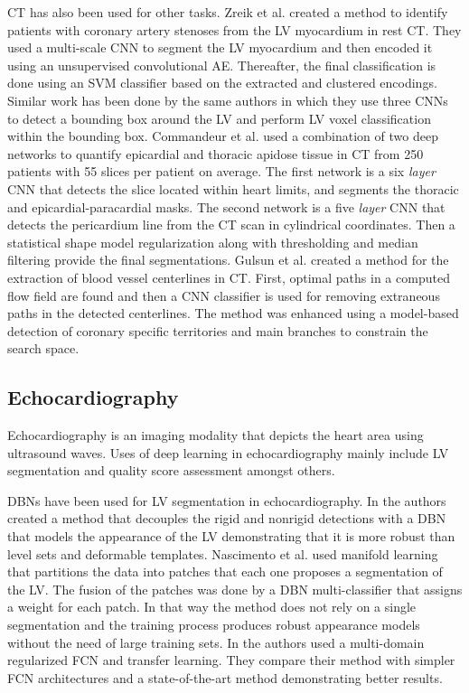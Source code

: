 \documentclass[journal]{IEEEtran}
\begin{document}
CT has also been used for other tasks.
Zreik et al.\cite{zreik2018deep} created a method to identify patients with coronary artery stenoses from the LV myocardium in rest CT\@.
They used a multi-scale CNN to segment the LV myocardium and then encoded it using an unsupervised convolutional AE\@.
Thereafter, the final classification is done using an SVM classifier based on the extracted and clustered encodings.
Similar work has been done by the same authors in\cite{zreik2016automatic} which they use three CNNs to detect a bounding box around the LV and perform LV voxel classification within the bounding box.
Commandeur et al.\cite{commandeur2018deep} used a combination of two deep networks to quantify epicardial and thoracic apidose tissue in CT from 250 patients with 55 slices per patient on average.
The first network is a six \textit{layer} CNN that detects the slice located within heart limits, and segments the thoracic and epicardial-paracardial masks.
The second network is a five \textit{layer} CNN that detects the pericardium line from the CT scan in cylindrical coordinates.
Then a statistical shape model regularization along with thresholding and median filtering provide the final segmentations.
Gulsun et al.\cite{gulsun2016coronary} created a method for the extraction of blood vessel centerlines in CT\@.
First, optimal paths in a computed flow field are found and then a CNN classifier is used for removing extraneous paths in the detected centerlines.
The method was enhanced using a model-based detection of coronary specific territories and main branches to constrain the search space.

\subsection{Echocardiography}
Echocardiography is an imaging modality that depicts the heart area using ultrasound waves.
Uses of deep learning in echocardiography mainly include LV segmentation and quality score assessment amongst others.

DBNs have been used for LV segmentation in echocardiography.
In\cite{carneiro2012segmentation} the authors created a method that decouples the rigid and nonrigid detections with a DBN that models the appearance of the LV demonstrating that it is more robust than level sets and deformable templates.
Nascimento et al.\cite{nascimento2016multi} used manifold learning that partitions the data into patches that each one proposes a segmentation of the LV\@.
The fusion of the patches was done by a DBN multi-classifier that assigns a weight for each patch.
In that way the method does not rely on a single segmentation and the training process produces robust appearance models without the need of large training sets.
In\cite{chen2016iterative} the authors used a multi-domain regularized FCN and transfer learning.
They compare their method with simpler FCN architectures and a state-of-the-art method demonstrating better results.
\end{document}
